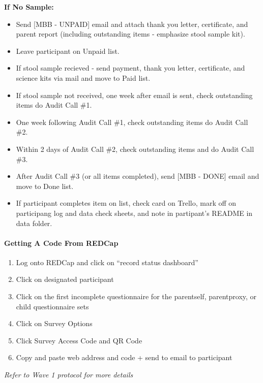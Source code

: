 \documentclass[]{book}
\let\oldparagraph\paragraph
\renewcommand{\paragraph}[1]{\oldparagraph{#1}\mbox{}}
\begin{document}
\textbf{If No Sample:}

\begin{itemize}
\item
  Send {[}MBB - UNPAID{]} email and attach thank you letter, certificate, and parent report (including outstanding items - emphasize stool sample kit).
\item
  Leave participant on Unpaid list.
\item
  If stool sample recieved - send payment, thank you letter, certificate, and science kits via mail and move to Paid list.
\item
  If stool sample not received, one week after email is sent, check outstanding items do Audit Call \#1.
\item
  One week following Audit Call \#1, check outstanding items do Audit Call \#2.
\item
  Within 2 days of Audit Call \#2, check outstanding items and do Audit Call \#3.
\item
  After Audit Call \#3 (or all items completed), send {[}MBB - DONE{]} email and move to Done list.
\item
  If participant completes item on list, check card on Trello, mark off on participang log and data check sheets, and note in partipant's README in data folder.
\end{itemize}

\hypertarget{getting-a-code-from-redcap-2}{%
\paragraph{Getting A Code From REDCap}\label{getting-a-code-from-redcap-2}}

\begin{enumerate}
\def\labelenumi{\arabic{enumi}.}
\item
  Log onto REDCap and click on ``record status dashboard''
\item
  Click on designated participant
\item
  Click on the first incomplete questionnaire for the parentself, parentproxy, or child questionnaire sets
\item
  Click on Survey Options
\item
  Click Survey Access Code and QR Code
\item
  Copy and paste web address and code + send to email to participant
\end{enumerate}

\emph{Refer to Wave 1 protocol for more details}
\end{document}
